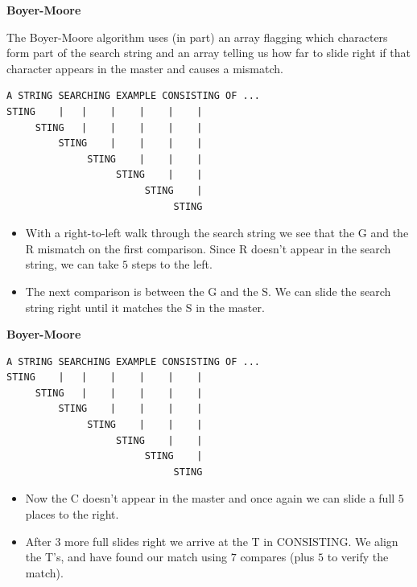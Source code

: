 \documentclass[a4,portraitt]{slides}
\begin{document}
\newpage
{\samepage
\begin{center}
{\Large{\bf Boyer-Moore}}
\end{center}

The Boyer-Moore algorithm uses (in part) an array flagging
which characters form part of the search string and an array telling
us how far to slide right if that character appears in the master and causes
a mismatch.
{\small
\begin{verbatim}
A STRING SEARCHING EXAMPLE CONSISTING OF ...
STING    |   |    |    |    |    |
     STING   |    |    |    |    |
         STING    |    |    |    |
              STING    |    |    |
                   STING    |    |
                        STING    |
                             STING
\end{verbatim}
}
\begin{itemize}
\item With a right-to-left walk through the search string we see that
the G and the R mismatch on the first comparison. Since R doesn't appear in the
search string, we can take $5$ steps to the left.
\item The next comparison is between the G and the S. We can slide the search string right until it matches the S in the master.
\end{itemize}
}

\newpage
{\samepage
\begin{center}
{\Large{\bf Boyer-Moore}}
\end{center}
{\small
\begin{verbatim}
A STRING SEARCHING EXAMPLE CONSISTING OF ...
STING    |   |    |    |    |    |
     STING   |    |    |    |    |
         STING    |    |    |    |
              STING    |    |    |
                   STING    |    |
                        STING    |
                             STING
\end{verbatim}
}
\begin{itemize}
\item Now the C doesn't appear in the master and once again we can slide a
full $5$ places to the right.
\item After $3$ more full slides right we arrive at the T in CONSISTING.
We align the T's, and have found our match using $7$ compares (plus $5$
to verify the match).
\end{itemize}
}
\end{document}

